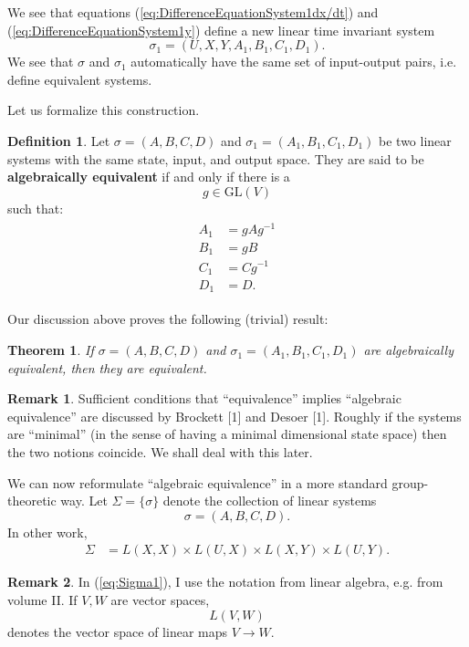 \documentclass[12pt]{book}
\theoremstyle{plain}
\newtheorem{theorem}{Theorem}[section]
\theoremstyle{definition}
\newtheorem{definition}{Definition}[section]
\newtheorem*{remark}{Remark}
\begin{document}
We see that equations (\ref{eq:DifferenceEquationSystem1dx/dt}) and (\ref{eq:DifferenceEquationSystem1y}) define a new linear time invariant system
$$\sigma_1 = (U, X, Y, A_1, B_1, C_1, D_1).$$
We see that $\sigma$ and $\sigma_1$ automatically have the same set of input-output pairs, i.e. define equivalent systems.

Let us formalize this construction.

\begin{definition}
    Let $\sigma = (A, B, C, D)$ and $\sigma_1 = (A_1, B_1, C_1, D_1)$ be two linear systems with the same state, input, and output space.
    They are said to be \textbf{algebraically equivalent} if and only if there is a
    $$g \in \textrm{GL}(V)$$
    such that:
    \begin{align}
    \begin{split}
        A_1 &= gAg^{-1} \\
        B_1 &= gB \\
        C_1 &= Cg^{-1} \\
        D_1 &= D.
    \end{split}
    \end{align}
\end{definition}

Our discussion above proves the following (trivial) result:
\begin{theorem}
    If $\sigma = (A, B, C, D)$ and $\sigma_1 = (A_1, B_1, C_1, D_1)$ are algebraically equivalent, then they are equivalent.
\end{theorem}

\begin{remark}
    Sufficient conditions that ``equivalence'' implies ``algebraic equivalence'' are discussed by Brockett [1] and Desoer [1]. %
    Roughly if the systems are ``minimal'' (in the sense of having a minimal dimensional state space) then the two notions coincide.
    We shall deal with this later.
\end{remark}

We can now reformulate ``algebraic equivalence'' in a more standard group-theoretic way.
Let $\Sigma = \{\sigma\}$ denote the collection of linear systems
$$\sigma = (A, B, C, D).$$
In other work, %
\begin{align} \label{eq:Sigma1}
    \Sigma &= L(X, X) \times L(U, X) \times L(X, Y) \times L(U, Y).
\end{align}

\begin{remark}
    In (\ref{eq:Sigma1}), I use the notation from linear algebra, e.g. from volume II. If $V, W$ are vector spaces,
    $$L(V, W)$$
    denotes the vector space of linear maps $V \to W$.
\end{remark}
\end{document}

